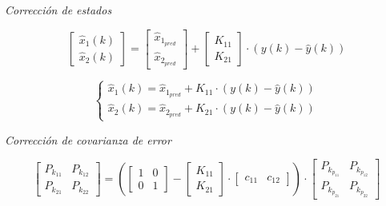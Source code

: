 \textit{Corrección de estados}

\vspace{-0.5cm}
\begin{equation}
    \begin{bmatrix}
        \hat{x}_{1}(k) \\
        \hat{x}_{2}(k) 
    \end{bmatrix}
    =
    \begin{bmatrix}
        \hat{x}_{1_{pred}} \\
        \hat{x}_{2_{pred}}
    \end{bmatrix}
    +
    \begin{bmatrix}
        K_{11} \\
        K_{21}
    \end{bmatrix}
    \cdot
    (y(k) - \hat{y}(k))
\end{equation}
\vspace{-0.5cm}

\vspace{-0.5cm}
\begin{equation}
    \begin{cases}
        \hat{x}_{1}(k) = \hat{x}_{1_{pred}} + K_{11} \cdot (y(k) - \hat{y}(k))
        \\
        \hat{x}_{2}(k) = \hat{x}_{2_{pred}} + K_{21} \cdot (y(k) - \hat{y}(k))
    \end{cases}
\end{equation}
\vspace{-0.5cm}

\textit{Corrección de covarianza de error}

\vspace{-0.5cm}
\begin{equation}
    \begin{bmatrix}
        P_{k_{11}} & P_{k_{12}} \\
        P_{k_{21}} & P_{k_{22}}
    \end{bmatrix}
    =
    \left(
    \begin{bmatrix}
        1 & 0 \\
        0 & 1
    \end{bmatrix}
    -
    \begin{bmatrix}
        K_{11} \\
        K_{21}
    \end{bmatrix}
    \cdot
    \begin{bmatrix}
        c_{11} & c_{12}
    \end{bmatrix}
    \right)
    \cdot
    \begin{bmatrix}
        P_{k_{p_{11}}} & P_{k_{p_{12}}} \\
        P_{k_{p_{21}}} & P_{k_{p_{22}}}
    \end{bmatrix}
\end{equation}
\vspace{-0.5cm}

